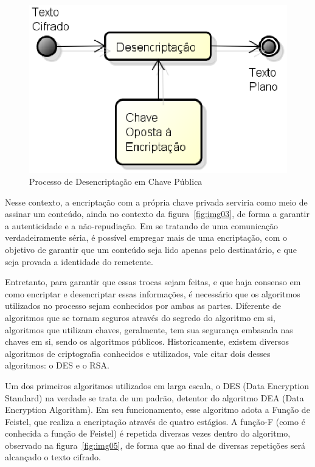 	\begin{figure}[!ht]
		\centering
		\includegraphics[keepaspectratio=true,scale=0.5]{figuras/desencript.eps}
		\caption{Processo de Desencriptação em Chave Pública}
		\label{fig:img04}
	\end{figure}

	Nesse contexto, a encriptação com a própria chave privada serviria como meio de assinar um conteúdo, ainda no contexto da figura~\ref{fig:img03}, de forma a garantir a autenticidade e a não-repudiação. Em se tratando de uma comunicação verdadeiramente séria, é possível empregar mais de uma encriptação, com o objetivo de garantir que um conteúdo seja lido apenas pelo destinatário, e que seja provada a identidade do remetente.
	
	Entretanto, para garantir  que essas trocas sejam feitas, e que haja consenso em como encriptar e desencriptar essas informações, é necessário que os algoritmos utilizados no processo sejam conhecidos por ambas as partes. Diferente de algoritmos que se tornam seguros através do segredo do algoritmo em si, algoritmos que utilizam chaves, geralmente, tem sua segurança embasada nas chaves em si, sendo os algoritmos públicos. Historicamente, existem diversos algoritmos de criptografia conhecidos e utilizados, vale citar dois desses algoritmos: o DES e o RSA.
	
	Um dos primeiros algoritmos utilizados em larga escala, o DES (Data Encryption Standard) na verdade se trata de um padrão, detentor do algoritmo DEA (Data Encryption Algorithm). Em seu funcionamento, esse algoritmo adota a Função de Feistel, que realiza a encriptação através de quatro estágios. A função-F (como é conhecida a função de Feistel) é repetida diversas vezes dentro do algoritmo, observado na figura~\ref{fig:img05}, de forma que ao final de diversas repetições será alcançado o texto cifrado.
	
